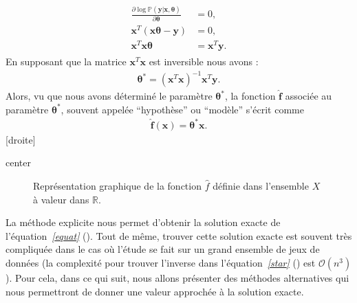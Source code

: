 \documentclass[letterpaper,11pt,english]{sphinxmanual}
\begin{document}
\begin{itemize}
\begin{equation}
\begin{split}\begin{aligned}
    \frac{\partial \log \mathbb{P}(\mathbf{y}| \mathbf{x}, \boldsymbol{\theta})}{\partial \boldsymbol{\theta}} &=0,\\
    \mathbf{x}^T(\mathbf{x}\boldsymbol{\theta} - \mathbf{y}) &= 0, \\
    \mathbf{x}^T\mathbf{x}\boldsymbol{\theta} &= \mathbf{x}^T\mathbf{y}.\end{aligned}\end{split}
\end{equation}
\sphinxAtStartPar
En supposant que la matrice \(\mathbf{x}^T\mathbf{x}\) est
inversible nous avons :
\begin{equation}\label{equation:chapter3:chapter3:8}
\begin{split}\boldsymbol{\theta}^{*} = (\mathbf{x}^T\mathbf{x})^{-1}\mathbf{x}^T\mathbf{y}.\end{split}
\end{equation}
\sphinxAtStartPar
Alors, vu que nous avons déterminé le paramètre
\(\boldsymbol{\theta}^{*}\), la fonction
\(\hat{\boldsymbol{f}}\) associée au paramètre
\(\boldsymbol{\theta}^{*}\), souvent appelée “hypothèse” ou
“modèle” s’écrit comme
\begin{equation}\label{equation:chapter3:chapter3:9}
\begin{split}\hat{\boldsymbol{f}}(\mathbf{x}) = \boldsymbol{\theta}^{*}\mathbf{x}.\end{split}
\end{equation}
\sphinxAtStartPar
{[}droite{]}

\begin{sphinxuseclass}{center}
\begin{figure}[H]
\centering
\capstart

\noindent{}
\caption{Représentation graphique de la fonction \(\hat{f}\) définie
dans l’ensemble \(X\) à valeur dans \(\mathbb{R}\).}\label{\detokenize{chapter3:id8}}\end{figure}

\end{sphinxuseclass}
\sphinxAtStartPar
La méthode explicite nous permet d’obtenir la solution exacte de
l’équation {\hyperref[\detokenize{chapter3:equat}]{\emph{{[}equat{]}}}} (). Tout de même, trouver cette solution
exacte est souvent très compliquée dans le cas où l’étude se fait sur
un grand ensemble de jeux de données (la complexité pour trouver
l’inverse dans l’équation {\hyperref[\detokenize{chapter3:star}]{\emph{{[}star{]}}}} () est
\(\mathcal{O}(n^{3})\)). Pour cela, dans ce qui suit, nous allons
présenter des méthodes alternatives qui nous permettront de donner
une valeur approchée à la solution exacte.


\end{itemize}
\end{document}
